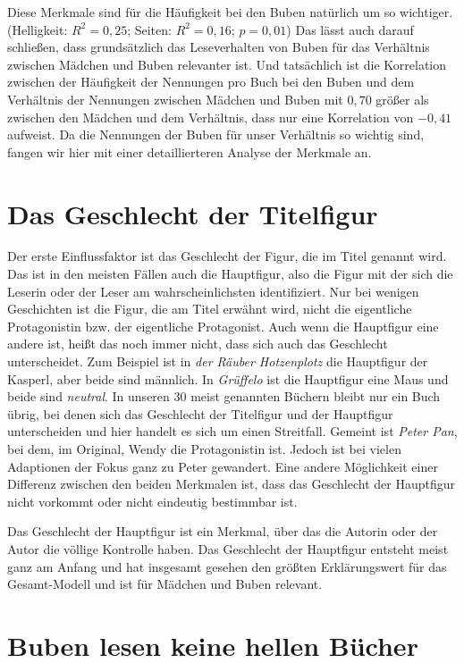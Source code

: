 Diese Merkmale sind für die Häufigkeit bei den Buben natürlich um so
wichtiger. (Helligkeit: $R^2=0{,}25$; Seiten: $R^2=0{,}16$; $p=0{,}01$)
Das lässt auch darauf schließen, dass grundsätzlich das Leseverhalten
von Buben für das Verhältnis zwischen Mädchen und Buben relevanter ist.
Und tatsächlich ist die Korrelation zwischen der Häufigkeit der
Nennungen pro Buch bei den Buben und dem Verhältnis der Nennungen
zwischen Mädchen und Buben mit $0{,}70$ größer als zwischen den Mädchen
und dem Verhältnis, dass nur eine Korrelation von $-0{,}41$ aufweist. Da
die Nennungen der Buben für unser Verhältnis so wichtig sind, fangen wir
hier mit einer detaillierteren Analyse der Merkmale an.

\section{Das Geschlecht der Titelfigur}

Der erste Einflussfaktor ist das Geschlecht der Figur, die im Titel
genannt wird. Das ist in den meisten Fällen auch die Hauptfigur, also
die Figur mit der sich die Leserin oder der Leser am wahrscheinlichsten
identifiziert. Nur bei wenigen Geschichten ist die Figur, die am Titel
erwähnt wird, nicht die eigentliche Protagonistin bzw. der eigentliche
Protagonist. Auch wenn die Hauptfigur eine andere ist, heißt das noch
immer nicht, dass sich auch das Geschlecht unterscheidet. Zum Beispiel
ist in \emph{der Räuber Hotzenplotz} die Hauptfigur der Kasperl, aber
beide sind männlich. In \emph{Grüffelo} ist die Hauptfigur eine Maus und
beide sind \emph{neutral}. In unseren 30 meist genannten Büchern bleibt
nur ein Buch übrig, bei denen sich das Geschlecht der Titelfigur und der
Hauptfigur unterscheiden und hier handelt es sich um einen Streitfall.
Gemeint ist \emph{Peter Pan}, bei dem, im Original, Wendy die
Protagonistin ist. Jedoch ist bei vielen Adaptionen der Fokus ganz zu
Peter gewandert. Eine andere Möglichkeit einer Differenz zwischen den
beiden Merkmalen ist, dass das Geschlecht der Hauptfigur nicht vorkommt
oder nicht eindeutig bestimmbar ist.

Das Geschlecht der Hauptfigur ist ein Merkmal, über das die Autorin oder
der Autor die völlige Kontrolle haben. Das Geschlecht der Hauptfigur
entsteht meist ganz am Anfang und hat insgesamt gesehen den größten
Erklärungswert für das Gesamt-Modell und ist für Mädchen und Buben
relevant.

\section{Buben lesen keine hellen Bücher}

